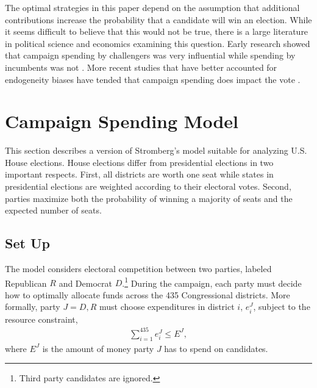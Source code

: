 \documentclass[12pt,final,fleqn]{article}
\theoremstyle{plain}
\begin{document}
The optimal strategies in this paper depend on the assumption that additional contributions increase the probability that a candidate will win an election. While it seems difficult to believe that this would not be true, there is a large literature in political science and economics examining this question. Early research showed that campaign spending by challengers was very influential while spending by incumbents was not \citep{jacobson1978effects, jacobson1980money,jacobson1985money}. More recent studies that have better accounted for endogeneity biases have tended that campaign spending does impact the vote \citep{gerber1998estimating, green1988salvation,erikson2000equilibria}. 

\section{Campaign Spending Model}
This section describes a version of Stromberg's \citeyear{stromberg2008electoral} model suitable for analyzing U.S. House elections. House elections differ from presidential elections in two important respects. First, all districts are worth one seat while states in presidential elections are weighted according to their electoral votes. Second, parties maximize both the probability of winning a majority of seats and the expected number of seats. 

\subsection{Set Up}
The model considers electoral competition between two parties, labeled Republican $R$ and Democrat $D$.\footnote{Third party candidates are ignored.} During the campaign, each party must decide how to optimally allocate funds across the 435 Congressional districts. More formally, party $J = D, R$ must choose expenditures in district $i$, $e^J_i$, subject to the resource constraint, 
\begin{align} \label{eqn: budget constraint}
\sum_{i=1}^{435} e^J_i \leq E^J,
\end{align}
where $E^J$ is the amount of money party $J$ has to spend on candidates.
\end{document}
